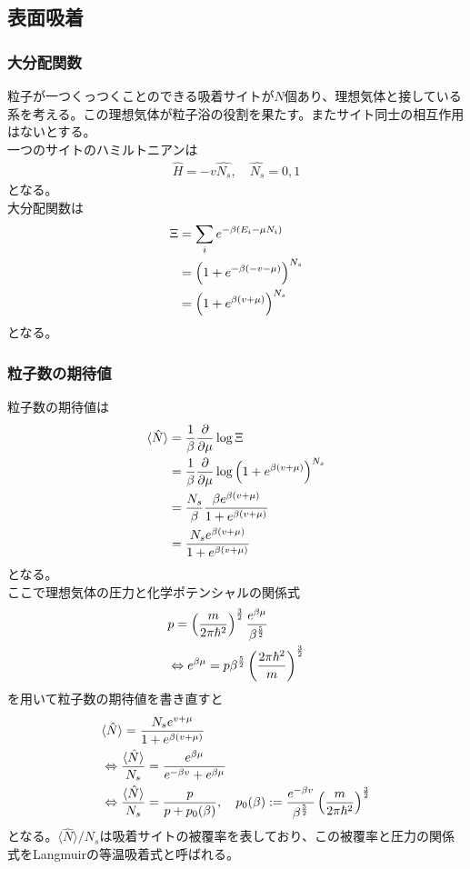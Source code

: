 \documentclass[dvipdfmx, 11pt, a4paper]{jsarticle}
\theoremstyle{definition}
\begin{document}
\subsection{表面吸着}
\subsubsection{大分配関数}
    粒子が一つくっつくことのできる吸着サイトが$N$個あり、理想気体と接している系を考える。この理想気体が粒子浴の役割を果たす。またサイト同士の相互作用はないとする。\\
    一つのサイトのハミルトニアンは
    \begin{align}
        \hat{H} = -v \hat{N_s},\quad \hat{N_s} = 0,1
    \end{align}
    となる。\\
    大分配関数は
    \begin{align}
        \Xi &= \sum_i e^{-\beta (E_i - \mu N_i) } \notag \\
        &= \left( 1 + e^{-\beta (-v - \mu)} \right)^{N_s} \notag \\
        &= \left( 1 + e^{\beta (v + \mu)} \right)^{N_s}
    \end{align}
    となる。
\subsubsection{粒子数の期待値}
    粒子数の期待値は
    \begin{align}
        \langle \hat{N} \rangle &= \frac{1}{\beta} \frac{\partial}{\partial \mu} \log \Xi \notag \\ 
        &= \frac{1}{\beta} \frac{\partial}{\partial \mu} \log \left( 1 + e^{\beta (v + \mu)} \right)^{N_s} \notag \\
        &= \frac{N_s}{\beta} \frac{\beta e^{\beta(v + \mu)}}{ 1 + e^{\beta (v + \mu)}} \notag \\
        &= \frac{N_s e^{\beta(v + \mu)}}{ 1 + e^{\beta (v + \mu)}}
    \end{align}
    となる。\\
    ここで理想気体の圧力と化学ポテンシャルの関係式
    \begin{align}
        &p = \left( \frac{m}{2\pi \hbar^2 } \right)^{\frac{3}{2}} \frac{e^{\beta \mu}}{\beta^{\frac{5}{2}}} \notag \\
        &\Leftrightarrow e^{\beta \mu} = p \beta^{\frac{5}{2}} \left( \frac{2\pi \hbar^2}{m} \right)^{\frac{3}{2}}
    \end{align}
    を用いて粒子数の期待値を書き直すと
    \begin{align}
        &\langle \hat{N} \rangle = \frac{N_s e^{v + \mu}}{ 1 + e^{\beta (v + \mu)}} \notag \\
        &\Leftrightarrow \frac{\langle \hat{N} \rangle}{N_s} = \frac{ e^{\beta \mu}}{ e^{-\beta v} + e^{\beta \mu}} \notag \\
        &\Leftrightarrow \frac{\langle \hat{N} \rangle}{N_s} = \frac{p}{p + p_0(\beta)} ,\quad p_0(\beta) := \frac{e^{-\beta v}}{\beta^{\frac{5}{2}}}  \left( \frac{m}{2\pi \hbar^2 } \right)^{\frac{3}{2}}
    \end{align}
    となる。$\langle \hat{N} \rangle / N_s$は吸着サイトの被覆率を表しており、この被覆率と圧力の関係式をLangmuirの等温吸着式と呼ばれる。 
\end{document}
